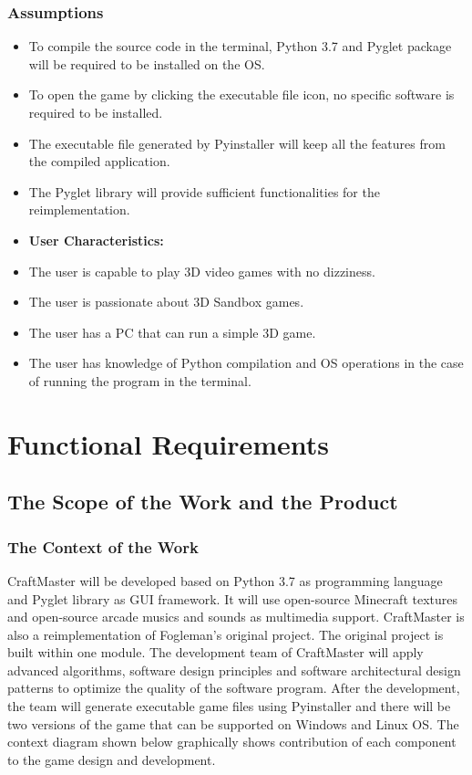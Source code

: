 \documentclass[12pt, titlepage]{article}
\begin{document}
\subsubsection{Assumptions}
\begin{itemize}
        \item To compile the source code in the terminal, Python 3.7 and Pyglet package will be required to be installed on the OS.
        \item To open the game by clicking the executable file icon, no specific software is required to be installed.
        \item The executable file generated by Pyinstaller will keep all the features from the compiled application.
        \item The Pyglet library will provide sufficient functionalities for the reimplementation.
        \item \textbf{User Characteristics:}
        \item The user is capable to play 3D video games with no dizziness.
        \item The user is passionate about 3D Sandbox games.
        \item The user has a PC that can run a simple 3D game.
        \item The user has knowledge of Python compilation and OS operations in the case of running the program in the terminal.
\end{itemize}








\section{Functional Requirements}

\subsection{The Scope of the Work and the Product}

\subsubsection{The Context of the Work}
CraftMaster will be developed based on Python 3.7 as programming language and Pyglet library as GUI framework. It will use open-source Minecraft textures and open-source arcade musics and sounds as multimedia support. CraftMaster is also a reimplementation of Fogleman's original project\cite{mine}. The original project is built within one module. The development team of CraftMaster will apply advanced algorithms, software design principles and software architectural design patterns to optimize the quality of the software program. After the development, the team will generate executable game files using Pyinstaller and there will be two versions of the game that can be supported on Windows and Linux OS. The context diagram shown below graphically shows contribution of each component to the game design and development.
\end{document}
